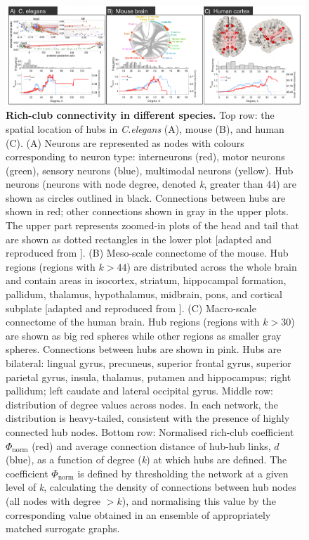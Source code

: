 \begin{figure}[h!]
\begin{center}
\includegraphics[width=1\textwidth]{Chapter3/Ch3Fig2.pdf}%
\end{center}
\caption{\textbf{Rich-club connectivity in different species.} Top row: the spatial location of hubs in \textit{C.elegans} (A), mouse (B), and human (C).
(A) Neurons are represented as nodes with colours corresponding to neuron type: interneurons (red), motor neurons (green), sensory neurons (blue), multimodal neurons (yellow). Hub neurons (neurons with node degree, denoted \textit{k}, greater than $44$) are shown as circles outlined in black. Connections between hubs are shown in red; other connections shown in gray in the upper plots. The upper part represents zoomed-in plots of the head and tail that are shown as dotted rectangles in the lower plot [adapted and reproduced from \citet{Arnatkeviciute2018}].
(B) Meso-scale connectome of the mouse. Hub regions (regions with $k > 44$) are distributed across the whole brain and contain areas in isocortex, striatum, hippocampal formation, pallidum, thalamus, hypothalamus, midbrain, pons, and cortical subplate [adapted and reproduced from \citet{Fulcher2016}].
(C) Macro-scale connectome of the human brain. Hub regions (regions with $k > 30$) are shown as big red spheres while other regions as smaller gray spheres. Connections between hubs are shown in pink. Hubs are bilateral: lingual gyrus, precuneus, superior frontal gyrus, superior parietal gyrus, insula, thalamus, putamen and hippocampus; right pallidum; left caudate and lateral occipital gyrus.
Middle row: distribution of degree values across nodes. In each network, the distribution is heavy-tailed, consistent with the presence of highly connected hub nodes.
Bottom row: Normalised rich-club coefficient $\Phi_\mathrm{norm}$ (red) and average connection distance of hub-hub links, $d$ (blue), as a function of degree (\textit{k}) at which hubs are defined.
The coefficient $\Phi_\mathrm{norm}$ is defined by thresholding the network at a given level of \textit{k}, calculating the density of connections between hub nodes (all nodes with degree $ > k$), and normalising this value by the corresponding value obtained in an ensemble of appropriately matched surrogate graphs.
}
\end{figure}
